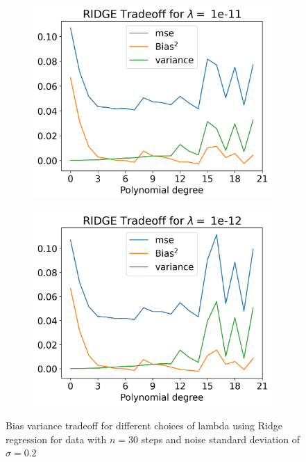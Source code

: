 \documentclass[12pt]{article}
\begin{document}
\begin{figure}[H]
\begin{subfigure}{.5\textwidth}
    \includegraphics[width=\textwidth]{../figures/tradeoff_RIDGE_1e-11_20.png}
    \caption{}
    \label{fig:l_1e-11}
  \end{subfigure}
  \begin{subfigure}{.5\textwidth}
    \centering
    \includegraphics[width=\textwidth]{../figures/tradeoff_RIDGE_1e-12_20.png}
    \caption{}
    \label{fig:l_1e-12}
  \end{subfigure}
  \caption{Bias variance tradeoff for different choices of lambda using Ridge regression for data with $n=30$ steps and noise standard deviation of $\sigma=0.2$}
  \label{fig:ridge_tradeoff}
\end{figure}
\end{document}
